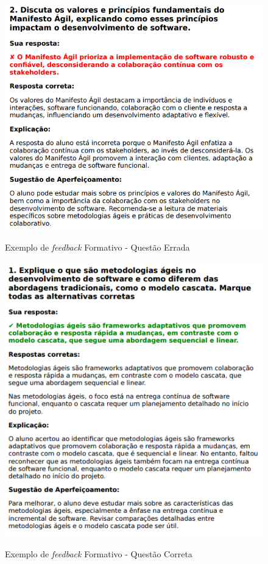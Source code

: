 \begin{figure}[H]
    \centering
    \caption{Exemplo de \textit{feedback} Formativo - Questão Errada}
    \includegraphics[width=1\textwidth]{figuras/feedback-example1.png}
    \label{fig:feedback_example1}
\end{figure}

\begin{figure}[H]
    \centering
    \caption{Exemplo de \textit{feedback} Formativo - Questão Correta}
    \includegraphics[width=1\textwidth]{figuras/feedback-example2.png}
    \label{fig:feedback_example2}
\end{figure}

